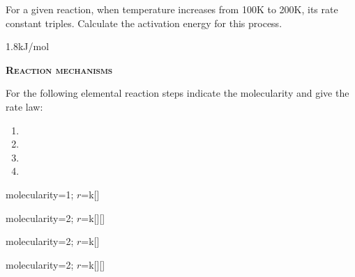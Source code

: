 \documentclass[main.tex]{subfiles}
\begin{document}
\begin{multicols*}{2}
\begin{question}[ID=\the\value{numA}]
For a given reaction, when temperature increases from 100K to 200K, its rate constant triples. 
Calculate the activation energy for this process.
\end{question}
\begin{solution}
1.8kJ/mol
\hspace{0.1cm}\end{solution}%


{\raggedright\textsc{\textbf{Reaction mechanisms }}\par}


\begin{question}[ID=\the\value{numA}]
For the following elemental reaction steps indicate the molecularity and give the rate law:
  \begin{enumerate} [topsep=0pt, partopsep=1pt, label=(\alph*), leftmargin=0.5cm]	
\item {}   %
\item {}%
\item {}%
\item {}%
\end{enumerate}
\end{question}
\begin{solution}
\begin{inparaenum}[(a)]	
\item  molecularity=1; $r$=k[]
\item  molecularity=2; $r$=k[][]
\item  molecularity=2; $r$=k[]
\item  molecularity=2; $r$=k[][]
 \end{inparaenum}
\hspace{0.1cm}\end{solution}%


\end{multicols*}
\end{document}
